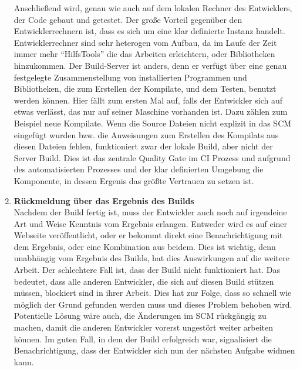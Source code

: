 \begin{enumerate}
		Anschließend wird, genau wie auch auf dem lokalen Rechner des Entwicklers, der Code gebaut und getestet. Der große Vorteil gegenüber den Entwicklerrechnern ist, dass es sich um eine klar definierte Instanz handelt. Entwicklerrechner sind sehr heterogen vom Aufbau, da im Laufe der Zeit immer mehr "`HilfsTools"' die das Arbeiten erleichtern, oder Bibliotheken hinzukommen. Der Build-Server ist anders, denn er verfügt über eine genau festgelegte Zusammenstellung von installierten Programmen und Bibliotheken, die zum Erstellen der Kompilate, und dem Testen, benutzt werden können. Hier fällt zum ersten Mal auf, falls der Entwickler sich auf etwas verlässt, das nur auf seiner Maschine vorhanden ist. Dazu zählen zum Beispiel neue Kompilate. Wenn die Source Dateien nicht explizit in das SCM eingefügt wurden bzw. die Anweisungen zum Erstellen des Kompilats aus diesen Dateien fehlen, funktioniert zwar der lokale Build, aber nicht der Server Build. Dies ist das zentrale Quality Gate im CI Prozess und aufgrund des automatisierten Prozesses und der klar definierten Umgebung die Komponente, in dessen Ergenis das größte Vertrauen zu setzen ist.
		\item \textbf{Rückmeldung über das Ergebnis des Builds}\\%
		Nachdem der Build fertig ist, muss der Entwickler auch noch auf irgendeine Art und Weise Kenntnis vom Ergebnis erlangen. Entweder wird es auf einer Webseite veröffentlicht, oder er bekommt direkt eine Benachrichtigung mit dem Ergebnis, oder eine Kombination aus beidem. Dies ist wichtig, denn unabhängig vom Ergebnis des Builds, hat dies Auswirkungen auf die weitere Arbeit. Der schlechtere Fall ist, dass der Build nicht funktioniert hat. Das bedeutet, dass alle anderen Entwickler, die sich auf diesen Build stützen müssen, blockiert sind in ihrer Arbeit. Dies hat zur Folge, dass so schnell wie möglich der Grund gefunden werden muss und dieses Problem behoben wird. Potentielle Lösung wäre auch, die Änderungen im SCM rückgängig zu machen, damit die anderen Entwickler vorerst ungestört weiter arbeiten können. Im guten Fall, in dem der Build erfolgreich war, signalisiert die Benachrichtigung, dass der Entwickler sich nun der nächsten Aufgabe widmen kann.
\end{enumerate}
